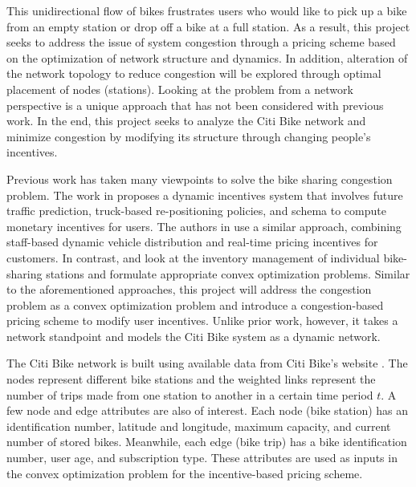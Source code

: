 \documentclass[times, 10pt,twocolumn]{article}
\begin{document}
This unidirectional flow of bikes frustrates users who would like to pick up a bike from an empty station or drop off a bike at a full station. As a result, this project seeks to address the issue of system congestion through a pricing scheme based on the optimization of network structure and dynamics. In addition, alteration of the network topology to reduce congestion will be explored through optimal placement of nodes (stations). Looking at the problem from a network perspective is a unique approach that has not been considered with previous work. In the end, this project seeks to analyze the Citi Bike network and minimize congestion by modifying its structure through changing people's incentives.


Previous work has taken many viewpoints to solve the bike sharing congestion problem. The work in \cite{incentives} proposes a dynamic incentives system that involves future traffic prediction, truck-based re-positioning policies, and schema to compute monetary incentives for users. The authors in \cite{redistribution} use a similar approach, combining staff-based dynamic vehicle distribution and real-time pricing incentives for customers. In contrast, \cite{management} and \cite{redistribution} look at the inventory management of individual bike-sharing stations and formulate appropriate convex optimization problems. Similar to the aforementioned approaches, this project will address the congestion problem as a convex optimization problem and introduce a congestion-based pricing scheme to modify user incentives. Unlike prior work, however, it takes a network standpoint and models the Citi Bike system as a dynamic network.


The Citi Bike network is built using available data from Citi Bike's website \cite{dataset}. The nodes represent different bike stations and the weighted links represent the number of trips made from one station to another in a certain time period $t$. A few node and edge attributes are also of interest. Each node (bike station) has an identification number, latitude and longitude, maximum capacity, and current number of stored bikes. Meanwhile, each edge (bike trip) has a bike identification number, user age, and subscription type. These attributes are used as inputs in the convex optimization problem for the incentive-based pricing scheme.
\end{document}
